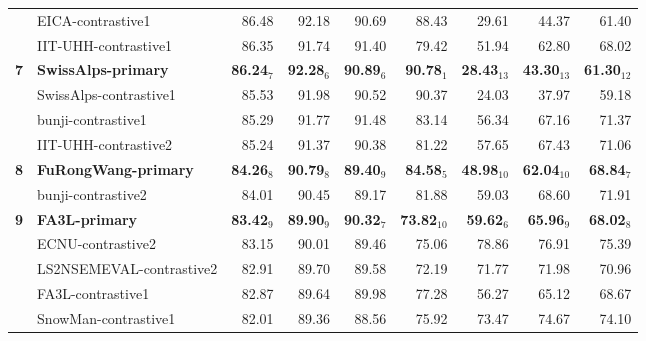\begin{table*}[tbh]
\begin{center}
\begin{tabular}{clrrrrrrr}
& EICA-contrastive1 & 86.48 & \scriptsize 92.18 & \scriptsize 90.69 & \scriptsize 88.43 & \scriptsize 29.61 & \scriptsize 44.37 & \scriptsize 61.40 \\
& IIT-UHH-contrastive1 & 86.35 & \scriptsize 91.74 & \scriptsize 91.40 & \scriptsize 79.42 & \scriptsize 51.94 & \scriptsize 62.80 & \scriptsize 68.02 \\
\bf 7 & \bf SwissAlps-primary & \bf 86.24$_{7}$ & \bf \scriptsize 92.28$_{6}$ & \bf \scriptsize 90.89$_{6}$ & \bf \scriptsize 90.78$_{1}$ & \bf \scriptsize 28.43$_{13}$ & \bf \scriptsize 43.30$_{13}$ & \bf \scriptsize 61.30$_{12}$ \\
& SwissAlps-contrastive1 & 85.53 & \scriptsize 91.98 & \scriptsize 90.52 & \scriptsize 90.37 & \scriptsize 24.03 & \scriptsize 37.97 & \scriptsize 59.18 \\
& bunji-contrastive1 & 85.29 & \scriptsize 91.77 & \scriptsize 91.48 & \scriptsize 83.14 & \scriptsize 56.34 & \scriptsize 67.16 & \scriptsize 71.37 \\
& IIT-UHH-contrastive2 & 85.24 & \scriptsize 91.37 & \scriptsize 90.38 & \scriptsize 81.22 & \scriptsize 57.65 & \scriptsize 67.43 & \scriptsize 71.06 \\
\bf 8 & \bf FuRongWang-primary & \bf 84.26$_{8}$ & \bf \scriptsize 90.79$_{8}$ & \bf \scriptsize 89.40$_{9}$ & \bf \scriptsize 84.58$_{5}$ & \bf \scriptsize 48.98$_{10}$ & \bf \scriptsize 62.04$_{10}$ & \bf \scriptsize 68.84$_{7}$ \\
& bunji-contrastive2 & 84.01 & \scriptsize 90.45 & \scriptsize 89.17 & \scriptsize 81.88 & \scriptsize 59.03 & \scriptsize 68.60 & \scriptsize 71.91 \\
\bf 9 & \bf FA3L-primary & \bf 83.42$_{9}$ & \bf \scriptsize 89.90$_{9}$ & \bf \scriptsize 90.32$_{7}$ & \bf \scriptsize 73.82$_{10}$ & \bf \scriptsize 59.62$_{6}$ & \bf \scriptsize 65.96$_{9}$ & \bf \scriptsize 68.02$_{8}$ \\
& ECNU-contrastive2 & 83.15 & \scriptsize 90.01 & \scriptsize 89.46 & \scriptsize 75.06 & \scriptsize 78.86 & \scriptsize 76.91 & \scriptsize 75.39 \\
& LS2NSEMEVAL-contrastive2 & 82.91 & \scriptsize 89.70 & \scriptsize 89.58 & \scriptsize 72.19 & \scriptsize 71.77 & \scriptsize 71.98 & \scriptsize 70.96 \\
& FA3L-contrastive1 & 82.87 & \scriptsize 89.64 & \scriptsize 89.98 & \scriptsize 77.28 & \scriptsize 56.27 & \scriptsize 65.12 & \scriptsize 68.67 \\
& SnowMan-contrastive1 & 82.01 & \scriptsize 89.36 & \scriptsize 88.56 & \scriptsize 75.92 & \scriptsize 73.47 & \scriptsize 74.67 & \scriptsize 74.10 \\

\end{tabular}
\end{center}
\end{table*}
